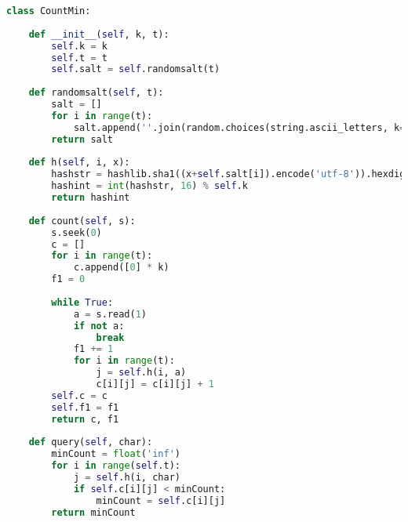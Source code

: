 \documentclass[11pt]{article}
\begin{document}
\begin{itemize}
\begin{lstlisting}[language=Python]
class CountMin:
    
    def __init__(self, k, t):
        self.k = k
        self.t = t
        self.salt = self.randomsalt(t)
        
    def randomsalt(self, t):
        salt = []
        for i in range(t):
            salt.append(''.join(random.choices(string.ascii_letters, k=10)))
        return salt
    
    def h(self, i, x):
        hashstr = hashlib.sha1((x+self.salt[i]).encode('utf-8')).hexdigest()
        hashint = int(hashstr, 16) % self.k
        return hashint
    
    def count(self, s):
        s.seek(0)
        c = []
        for i in range(t):
            c.append([0] * k)
        f1 = 0
        
        while True:
            a = s.read(1)
            if not a:
                break
            f1 += 1
            for i in range(t):
                j = self.h(i, a)
                c[i][j] = c[i][j] + 1
        self.c = c
        self.f1 = f1
        return c, f1
    
    def query(self, char):
        minCount = float('inf')
        for i in range(self.t):
            j = self.h(i, char)
            if self.c[i][j] < minCount:
                minCount = self.c[i][j]
        return minCount
\end{lstlisting}
\end{itemize}
\end{document}
